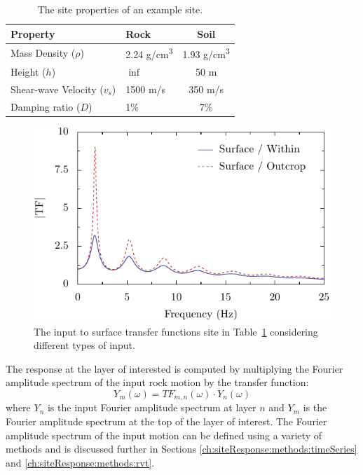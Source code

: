 \documentclass[11pt]{report}
\begin{document}
\begin{table}[t]
  \centering
  \begin{tabular}{llc}
	\hline\hline
	\textbf{Property} & \textbf{Rock} & \textbf{Soil} \\
	\hline
	Mass Density ($\rho$) 		& 2.24 g/cm\textsuperscript{3} & 1.93 g/cm\textsuperscript{3} \\
	Height ($h$)				& $\inf$		& 50 m \\
	Shear-wave Velocity ($v_s$)	& 1500 m/s		& 350 m/s \\
	Damping ratio ($D$)			& 1\%			& 7\% \\
	\hline
  \end{tabular}
  \caption{The site properties of an example site.}
  \label{tab:siteResponse:site}
\end{table}
\begin{figure}[t]
  \begin{center}
	\includegraphics[width=\linewidth]{figures/siteResponse/sra-transFunc.pdf}
  \end{center}
  \caption{The input to surface transfer functions site in Table~\ref{tab:siteResponse:site}
  considering different types of input.}
  \label{fig:siteResponse:transFunc}
\end{figure}


The response at the layer of interested is computed by multiplying the Fourier amplitude spectrum of the
input rock motion by the transfer function:
\begin{equation}
  Y_m(\omega) = TF_{m,n}(\omega) \cdot Y_n(\omega)
  \label{eq:tfApplication}
\end{equation}
where $Y_n$ is the input Fourier amplitude spectrum at layer $n$ and $Y_m$ is the Fourier amplitude
spectrum at the top of the layer of interest.  The Fourier amplitude spectrum of the input motion
can be defined using a variety of methods and is discussed further in Sections
\ref{ch:siteResponse:methods:timeSeries} and \ref{ch:siteResponse:methods:rvt}.
\end{document}
